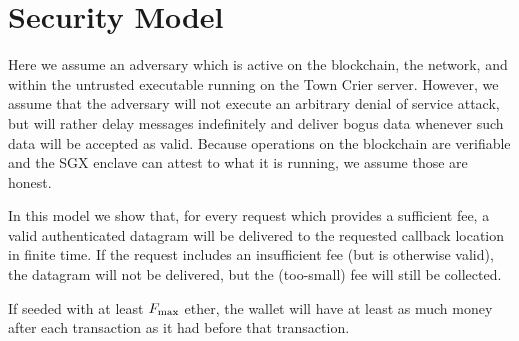 \section{Security Model}

Here we assume an adversary which is active on the blockchain, the network, and within the untrusted executable running on the Town Crier server.
However, we assume that the adversary will not execute an arbitrary denial of service attack, but will rather delay messages indefinitely and deliver bogus data whenever such data will be accepted as valid.
Because operations on the blockchain are verifiable and the SGX enclave can attest to what it is running, we assume those are honest.

In this model we show that, for every request which provides a sufficient fee,
a valid authenticated datagram will be delivered to the requested callback location in finite time.
If the request includes an insufficient fee (but is otherwise valid),
the datagram will not be delivered, but the (too-small) fee will still be collected.

\begin{lemma} \label{lem:non-bankrupt-p_sgx}
If seeded with at least $F_{\rm max}$ ether, the \sgxadd wallet will have
at least as much money after each transaction as it had before that transaction.
\end{lemma}

